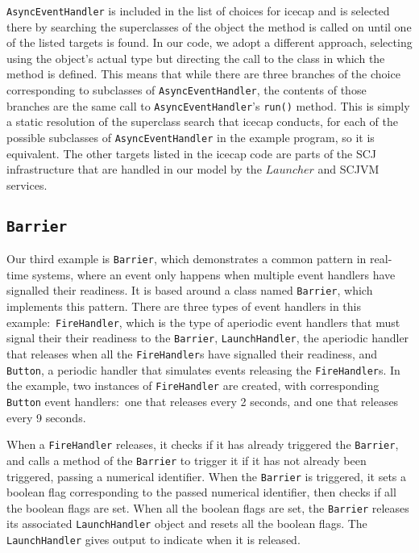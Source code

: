 \texttt{AsyncEventHandler} is included in the list of choices for
icecap and is selected there by searching the superclasses of the
object the method is called on until one of the listed targets is
found.
In our code, we adopt a different approach, selecting using the
object's actual type but directing the call to the class in which the
method is defined.
This means that while there are three branches of the choice
corresponding to subclasses of \texttt{AsyncEventHandler}, the
contents of those branches are the same call to
\texttt{AsyncEventHandler}'s \texttt{run()} method.
This is simply a static resolution of the superclass search that
icecap conducts, for each of the possible subclasses of
\texttt{AsyncEventHandler} in the example program, so it is
equivalent.
The other targets listed in the icecap code are parts of the SCJ
infrastructure that are handled in our model by the $Launcher$ and
SCJVM services.


\subsection{\texorpdfstring{\texttt{Barrier}}{Barrier}}
\label{barrier-subsection}

Our third example is \texttt{Barrier}, which demonstrates a common
pattern in real-time systems, where an event only happens when
multiple event handlers have signalled their readiness.
It is based around a class named \texttt{Barrier}, which implements
this pattern.
There are three types of event handlers in this
example:~\texttt{FireHandler}, which is the type of aperiodic event
handlers that must signal their their readiness to the
\texttt{Barrier}, \texttt{LaunchHandler}, the aperiodic handler that
releases when all the \texttt{FireHandler}s have signalled their
readiness, and \texttt{Button}, a periodic handler that simulates
events releasing the \texttt{FireHandler}s.
In the example, two instances of \texttt{FireHandler} are created,
with corresponding \texttt{Button} event handlers:~one that releases
every 2 seconds, and one that releases every 9 seconds.

When a \texttt{FireHandler} releases, it checks if it has already
triggered the \texttt{Barrier}, and calls a method of the
\texttt{Barrier} to trigger it if it has not already been triggered,
passing a numerical identifier.
When the \texttt{Barrier} is triggered, it sets a boolean flag
corresponding to the passed numerical identifier, then checks if all
the boolean flags are set.
When all the boolean flags are set, the \texttt{Barrier} releases its
associated \texttt{LaunchHandler} object and resets all the boolean
flags.
The \texttt{LaunchHandler} gives output to indicate when it is
released.

